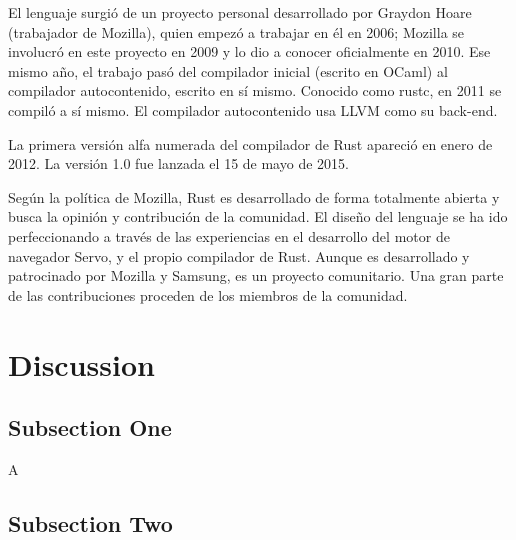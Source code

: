 \documentclass[twoside,twocolumn]{article}
\begin{document}
El lenguaje surgió de un proyecto personal desarrollado por Graydon Hoare (trabajador de Mozilla), quien empezó a trabajar en él en 2006; Mozilla se involucró en este proyecto en 2009​ y lo dio a conocer oficialmente en 2010.​ Ese mismo año, el trabajo pasó del compilador inicial (escrito en OCaml) al compilador autocontenido, escrito en sí mismo.​ Conocido como rustc, en 2011 se compiló a sí mismo.​ El compilador autocontenido usa LLVM como su back-end.

La primera versión alfa numerada del compilador de Rust apareció en enero de 2012.​ La versión 1.0 fue lanzada el 15 de mayo de 2015.

Según la política de Mozilla, Rust es desarrollado de forma totalmente abierta y busca la opinión y contribución de la comunidad. El diseño del lenguaje se ha ido perfeccionando a través de las experiencias en el desarrollo del motor de navegador Servo,​ y el propio compilador de Rust. Aunque es desarrollado y patrocinado por Mozilla y Samsung, es un proyecto comunitario. Una gran parte de las contribuciones proceden de los miembros de la comunidad.


\section{Discussion}

\subsection{Subsection One}

A


\subsection{Subsection Two}




\begin{thebibliography}{99} %

\end{thebibliography}

\end{document}
